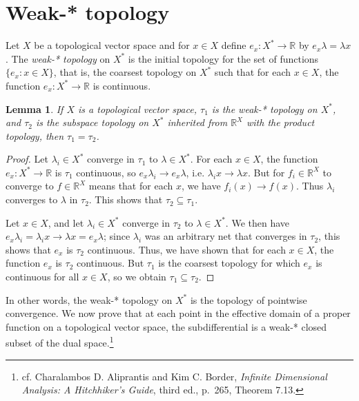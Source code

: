 \documentclass{article}
\newtheorem{lemma}[theorem]{Lemma}
\theoremstyle{definition}
\begin{document}
\section{Weak-* topology}
Let $X$ be a topological vector space and for $x \in X$ define $e_x:X^* \to \mathbb{R}$ by $e_x \lambda=\lambda x$.
The {\em weak-* topology} on $X^*$ is the initial topology
for the set of functions $\{e_x: x \in X\}$, that is, the coarsest topology on $X^*$ such that for each $x \in X$, the function
$e_x:X^* \to \mathbb{R}$ is continuous.

\begin{lemma}
If $X$ is a topological vector space, $\tau_1$ is the weak-* topology on $X^*$, and $\tau_2$ is the subspace topology on $X^*$ inherited from $\mathbb{R}^X$ with the product
topology, then $\tau_1=\tau_2$.
\end{lemma}
\begin{proof}
Let $\lambda_i \in X^*$ converge in $\tau_1$ to $\lambda \in X^*$. For each $x \in X$, the function $e_x:X^* \to \mathbb{R}$ is $\tau_1$ continuous, so 
$e_x \lambda_i \to e_x \lambda$, i.e. $\lambda_i x \to \lambda x$. But for $f_i \in \mathbb{R}^X$ to converge to $f \in \mathbb{R}^X$ means that for each $x$, we have
$f_i(x) \to f(x)$. Thus $\lambda_i$ converges to $\lambda$ in $\tau_2$. This shows that $\tau_2 \subseteq \tau_1$. 

Let $x \in X$, and
let $\lambda_i \in X^*$ converge in $\tau_2$ to $\lambda \in X^*$. 
We then have $e_x \lambda_i = \lambda_i x \to \lambda x = e_x \lambda$; since $\lambda_i$ was an arbitrary net that
converges in $\tau_2$, this shows that $e_x$ is $\tau_2$ continuous. Thus, we have shown that for each $x \in X$, the function
$e_x$ is $\tau_2$ continuous. But $\tau_1$ is the coarsest topology for which $e_x$ is continuous for all $x \in X$, so 
we obtain $\tau_1 \subseteq \tau_2$. 
\end{proof}

In other words, the weak-* topology on $X^*$ is the topology of pointwise convergence.
We now prove that 
at each point in the effective domain of a proper function on a topological vector space, 
the subdifferential is a weak-* closed subset of the dual space.\footnote{cf. Charalambos D. Aliprantis and Kim C. Border, {\em Infinite Dimensional Analysis: A Hitchhiker's Guide}, third ed., p.~265, Theorem 7.13.}
\end{document}
